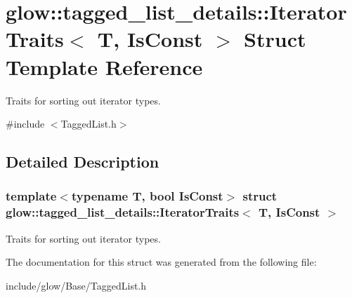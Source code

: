 \hypertarget{structglow_1_1tagged__list__details_1_1_iterator_traits}{}\section{glow\+:\+:tagged\+\_\+list\+\_\+details\+:\+:Iterator\+Traits$<$ T, Is\+Const $>$ Struct Template Reference}
\label{structglow_1_1tagged__list__details_1_1_iterator_traits}


Traits for sorting out iterator types.  




{\ttfamily \#include $<$Tagged\+List.\+h$>$}



\subsection{Detailed Description}
\subsubsection*{template$<$typename T, bool Is\+Const$>$\newline
struct glow\+::tagged\+\_\+list\+\_\+details\+::\+Iterator\+Traits$<$ T, Is\+Const $>$}

Traits for sorting out iterator types. 

The documentation for this struct was generated from the following file\+:\begin{DoxyCompactItemize}
\item 
include/glow/\+Base/Tagged\+List.\+h\end{DoxyCompactItemize}
